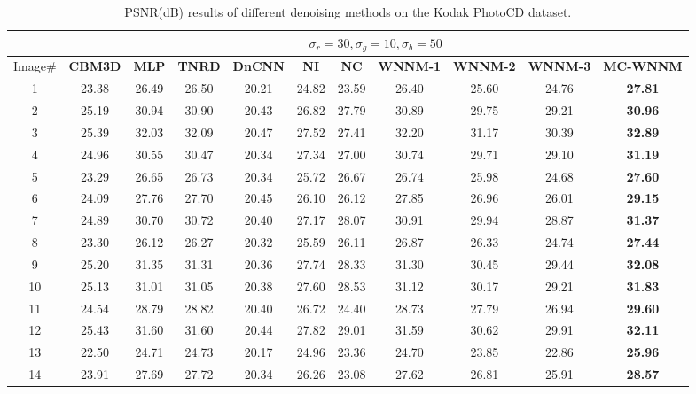 \begin{table}
\caption{PSNR(dB) results of different denoising methods on the Kodak PhotoCD dataset.}
\label{tab4-2}
\begin{center}
\renewcommand\arraystretch{1.0}
\scriptsize
\begin{tabular}{|c||c|c|c|c|c|c|c|c|c|c|}
\hline
&\multicolumn{10}{c|}{ $\sigma_{r} = 30, \sigma_{g} = 10, \sigma_{b} = 50$}
\\
\hline
\hline
Image\#
&
\textbf{CBM3D}
&
\textbf{MLP}
&
\textbf{TNRD} 
&
\textbf{DnCNN}
&
\textbf{NI} 
&
\textbf{NC}
&
\textbf{WNNM-1} 
&
\textbf{WNNM-2}
&
\textbf{WNNM-3}
&
\textbf{MC-WNNM}
\\
\hline
1& 23.38 & 26.49 & 26.50 & 20.21 & 24.82 & 23.59 & 26.40 & 25.60 & 24.76 & \textbf{27.81}
\\
\hline
2& 25.19 & 30.94 & 30.90 & 20.43 & 26.82 & 27.79 & 30.89 & 29.75 & 29.21 & \textbf{30.96}
\\
\hline
3& 25.39 & 32.03 & 32.09 & 20.47 & 27.52 & 27.41 & 32.20 & 31.17 & 30.39 & \textbf{32.89}
\\
\hline 
4& 24.96 & 30.55 & 30.47 & 20.34 & 27.34 & 27.00 & 30.74 & 29.71 & 29.10 & \textbf{31.19} 
\\
\hline
5& 23.29 & 26.65 & 26.73 & 20.34 & 25.72 & 26.67 & 26.74 & 25.98 & 24.68 & \textbf{27.60}
\\
\hline
6& 24.09 & 27.76 & 27.70 & 20.45 & 26.10 & 26.12 & 27.85 & 26.96 & 26.01 & \textbf{29.15}
\\
\hline
7& 24.89 & 30.70 & 30.72 & 20.40 & 27.17 & 28.07 & 30.91 & 29.94 & 28.87 & \textbf{31.37} 
\\
\hline
8& 23.30 & 26.12 & 26.27 & 20.32 & 25.59 & 26.11 & 26.87 & 26.33 & 24.74 & \textbf{27.44}
\\
\hline
9& 25.20 & 31.35 & 31.31 & 20.36 & 27.74 & 28.33 & 31.30 & 30.45 & 29.44 & \textbf{32.08}
\\
\hline
10& 25.13 & 31.01 & 31.05 & 20.38 & 27.60 & 28.53 & 31.12 & 30.17 & 29.21 & \textbf{31.83}
\\
\hline
11& 24.54 & 28.79 & 28.82 & 20.40 & 26.72 & 24.40 & 28.73 & 27.79 & 26.94 & \textbf{29.60}
\\
\hline
12& 25.43 & 31.60 & 31.60 & 20.44 & 27.82 & 29.01 & 31.59 & 30.62 & 29.91 & \textbf{32.11}
\\
\hline
13& 22.50 & 24.71 & 24.73 & 20.17 & 24.96 & 23.36 & 24.70 & 23.85 & 22.86 & \textbf{25.96}
\\
\hline
14& 23.91 & 27.69 & 27.72 & 20.34 & 26.26 & 23.08 & 27.62 & 26.81 & 25.91 & \textbf{28.57}

\end{tabular}
\end{center}
\end{table}
